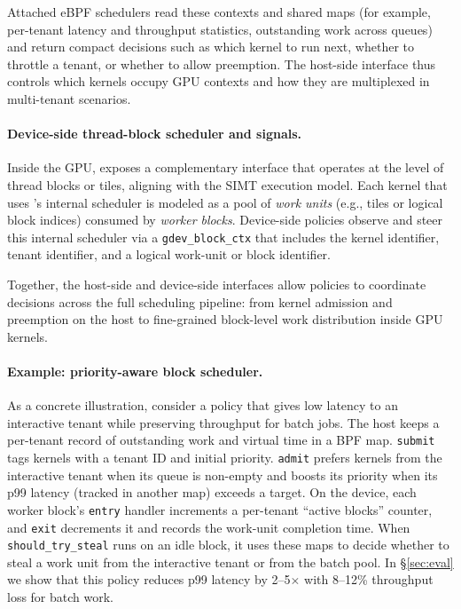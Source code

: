 Attached eBPF schedulers read these contexts and shared maps (for example, per-tenant
latency and throughput statistics, outstanding work across queues) and return compact
decisions such as which kernel to run next, whether to throttle a tenant, or whether
to allow preemption. The host-side interface thus controls which kernels occupy GPU
contexts and how they are multiplexed in multi-tenant scenarios.
\paragraph{Device-side thread-block scheduler and signals.}

Inside the GPU, \sys exposes a complementary interface that operates at the level of
thread blocks or tiles, aligning with the SIMT execution model. Each kernel that uses \sys's internal scheduler is modeled as a pool of \emph{work units} (e.g., tiles or logical block indices) consumed by \emph{worker blocks}. Device-side policies observe and steer this internal scheduler via a \texttt{gdev\_block\_ctx} that includes the kernel identifier, tenant identifier, and a logical work-unit or block identifier.

Together, the host-side and device-side interfaces allow \sys policies to coordinate decisions across the full scheduling pipeline: from kernel admission and preemption on the host to fine-grained block-level work distribution inside GPU kernels.

\paragraph{Example: priority-aware block scheduler.}
As a concrete illustration, consider a policy that gives low latency to an interactive tenant while preserving throughput for batch jobs. The host keeps a per-tenant record of outstanding work and virtual time in a BPF map. \texttt{submit} tags kernels with a tenant ID and initial priority. \texttt{admit} prefers kernels from the interactive tenant when its queue is non-empty and boosts its priority when its p99 latency (tracked in another map) exceeds a target. On the device, each worker block's \texttt{entry} handler increments a per-tenant ``active blocks'' counter, and \texttt{exit} decrements it and records the work-unit completion time. When \texttt{should\_try\_steal} runs on an idle block, it uses these maps to decide whether to steal a work unit from the interactive tenant or from the batch pool. In \S\ref{sec:eval} we show that this policy reduces p99 latency by 2--5$\times$ with 8--12\% throughput loss for batch work.


